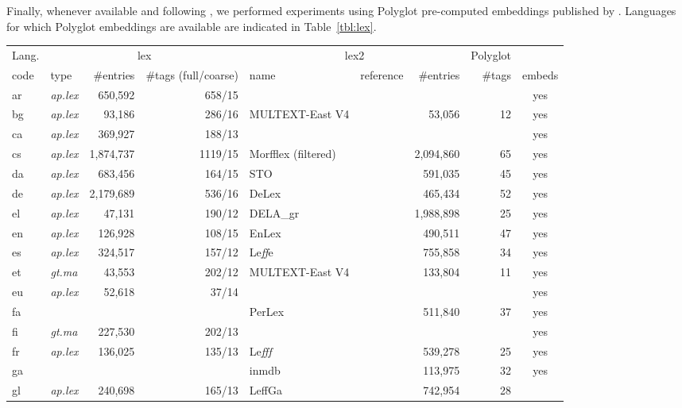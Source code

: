 \documentclass[11pt,letterpaper]{article}
\begin{document}
Finally, whenever available and following \citet{plank16}, we performed experiments using Polyglot pre-computed
embeddings published by \citet{alrfou13}. Languages for which Polyglot embeddings are available are indicated in Table~\ref{tbl:lex}.

\begin{table}
\centering
\scriptsize
\begin{tabular}{l|lrr|llrrc}
\toprule
Lang. & \multicolumn{3}{c}{\sc lex} & \multicolumn{3}{|c}{\sc lex2} & Polyglot\\
code & type & \#entries & \#tags (full/coarse) & name & reference & \#entries & \#tags & embeds\\
\midrule
ar & {\em ap.lex} & 650,592 & 658/15 &  &  &  &  & yes\\
bg & {\em ap.lex} & 93,186 & 286/16 & MULTEXT-East V4 & \citep{erjavec10} & 53,056 & 12 & yes\\
ca & {\em ap.lex} & 369,927 & 188/13 &  &  &  &  & yes\\
cs & {\em ap.lex} & 1,874,737 & 1119/15 & Morfflex (filtered) & \citep{hajic13} & 2,094,860 & 65 & yes\\
da & {\em ap.lex} & 683,456 & 164/15 & STO & \citep{braasch08} & 591,035 & 45 & yes\\
de & {\em ap.lex} & 2,179,689 & 536/16 & DeLex & \citep{sagot14delex} & 465,434 & 52 & yes\\
el & {\em ap.lex} & 47,131 & 190/12 & DELA\_gr & \citep{symeonidis99} & 1,988,898 & 25 & yes\\
en & {\em ap.lex} & 126,928 & 108/15 & EnLex & \citep{sagot10lefff} & 490,511 & 47 & yes\\
es & {\em ap.lex} & 324,517 & 157/12 & Le{\it ff}e & \citep{molinero09} & 755,858 & 34 & yes\\
et & {\em gt.ma} & 43,553 & 202/12 & MULTEXT-East V4 & \citep{erjavec10} & 133,804 & 11 & yes\\
eu & {\em ap.lex} & 52,618 & 37/14 &  &  &  &  & yes\\
fa &  &  &  & PerLex & \citep{sagot10perlex} & 511,840 & 37 & yes\\
fi & {\em gt.ma} & 227,530 & 202/13 &  &  &  &  & yes\\
fr & {\em ap.lex} & 136,025 & 135/13 & Le{\it fff} & \citep{sagot10lefff} & 539,278 & 25 & yes\\
ga &  &  &  & inmdb & \citep{mechura14} & 113,975 & 32 & yes\\
gl & {\em ap.lex} & 240,698 & 165/13 & LeffGa & \citep{sagot10lefff} & 742,954 & 28 & \\

\end{tabular}
\end{table}
\end{document}
